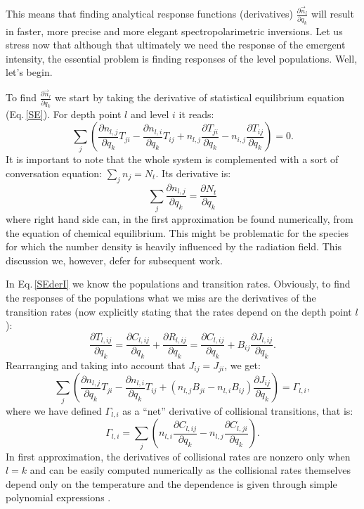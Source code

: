 \documentclass[referee]{aa}
\begin{document}
This means that finding analytical response functions (derivatives) $\frac{\partial \vec{n}_l}{\partial q_k}$ will result in faster, more precise and more elegant spectropolarimetric inversions. Let us stress now that although that ultimately we need the response of the emergent intensity, the essential problem is finding responses of the level populations. Well, let's begin.

To find $\frac{\partial \vec{n}_l}{\partial q_k}$ we start by taking the derivative of statistical equilibrium equation (Eq.\,\ref{SE}). For depth point $l$ and level $i$ it reads:
\begin{equation}
 \sum_j \left(  \frac{\partial n_{l,j}}{\partial q_k} T_{ji} - \frac{\partial n_{l,i}}{\partial q_k} T_{ij} + n_{l,j} \frac{\partial T_{ji}}{\partial q_k} - n_{i,j} \frac{\partial T_{ij}}{\partial q_k} \right) = 0.
 \label{SEderI}
\end{equation}
It is important to note that the whole system is complemented with a sort of conversation equation: $\sum_j n_j = N_t$. Its derivative is:
\begin{equation}
 \sum_j \frac{\partial n_{l,j}}{\partial q_k} = \frac{\partial N_t}{\partial q_k}
\end{equation}
where right hand side can, in the first approximation be found numerically, from the equation of chemical equilibrium. This might be problematic for the species for which the number density is heavily influenced by the radiation field. This discussion we, however, defer for subsequent work. 

In Eq.\,\ref{SEderI} we know the populations and transition rates. Obviously, to find the responses of the populations what we miss are the derivatives of the transition rates (now explicitly stating that the rates depend on the depth point $l$):
\begin{equation}
 \frac{\partial T_{l,ij}}{\partial q_k} = \frac{\partial C_{l,ij}}{\partial q_k} + \frac{\partial R_{l,ij}}{\partial q_k} = \frac{\partial C_{l,ij}}{\partial q_k} + B_{ij} \frac{\partial J_{l,ij}}{\partial q_k}.
\end{equation}
Rearranging and taking into account that $J_{ij} = J_{ji}$, we get:
\begin{equation}
 \sum_j \left ( \frac{\partial n_{l,j}}{\partial q_k} T_{ji} - \frac{\partial n_{l,i}}{\partial q_k} T_{ij} + (n_{l,j}B_{ji} - n_{l,i}B_{ij}) \frac{\partial J_{ij}}{\partial q_k} \right ) = \Gamma_{l,i},
\end{equation}
where we have defined $\Gamma_{l,i}$ as a ``net'' derivative of collisional transitions, that is:
\begin{equation}
 \Gamma_{l,i} = \sum_j (n_{l,i} \frac{\partial C_{l,ij}}{\partial q_k} - n_{l,j} \frac{\partial C_{l,ji}}{\partial q_k}).
\end{equation}
In first approximation, the derivatives of collisional rates are nonzero only when $l=k$ and can be easily computed numerically as the collisional rates themselves depend only on the temperature and the dependence is given through simple polynomial expressions \citep{Mihalasbook}. 
\end{document}

